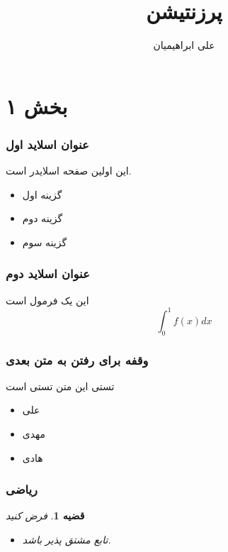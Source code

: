 \documentclass[xcolor=dvipsnames,professionalfonts]{beamer}
\author{علی ابراهیمیان}
\title{پرزنتیشن}
\institute{دانشگاه آزاد اسلامی}
\newtheorem{thm}{قضیه}
\begin{document}
\section{بخش ۱}
\frame{\maketitle}

\begin{frame}
    \frametitle{عنوان اسلاید اول}
    \begin{block}{}
        این اولین صفحه اسلایدر است.
        \begin{itemize}\raggedright
            \item گزینه اول
            \item گزینه دوم
            \item گزینه سوم
        \end{itemize}
    \end{block}
\end{frame}

\begin{frame}
    \frametitle{عنوان اسلاید دوم}
    \begin{block}{}
        این یک فرمول است
        \[
        \int_{0}^{1}{f(x)}dx
        \]
    \end{block}
\end{frame}

\begin{frame}
    \frametitle{وقفه برای رفتن به  متن بعدی}
    \begin{block}{تستی}
        این متن تستی است
        \begin{itemize}
            \item علی
            \item مهدی
            \pause
            \item هادی
            \pause
        \end{itemize}
    \end{block}
\end{frame}

\begin{frame}
    \frametitle{ریاضی}
    \begin{thm}
        فرض کنید
        \begin{itemize}\raggedright
            \item تابع مشتق پذیر باشد.
        \end{itemize}
    \end{thm}
\end{frame}
\end{document}
